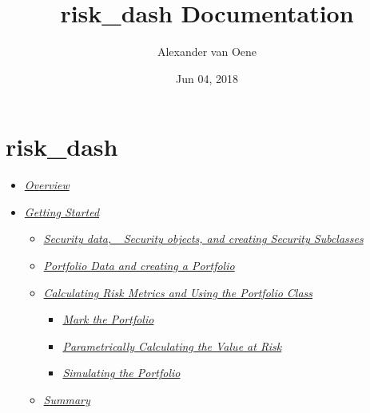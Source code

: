 \documentclass[letterpaper,10pt,english]{sphinxmanual}
\title{risk\_dash Documentation}
\date{Jun 04, 2018}
\author{Alexander van Oene}
\begin{document}
\maketitle
\sphinxtableofcontents
{}\label{\detokenize{index::doc}}

\label{\detokenize{gettingstarted:gettingstarted}}

\chapter{risk\_dash}
\label{\detokenize{gettingstarted:risk-dash}}\label{\detokenize{gettingstarted::doc}}\begin{itemize}
\item {} 
{\hyperref[\detokenize{gettingstarted:overview}]{\emph{Overview}}}

\item {} 
{\hyperref[\detokenize{gettingstarted:getting-started}]{\emph{Getting Started}}}
\begin{itemize}
\item {} 
{\hyperref[\detokenize{gettingstarted:security-data-security-objects-and-creating-security-subclasses}]{\emph{Security data, \_Security objects, and creating Security
Subclasses}}}

\item {} 
{\hyperref[\detokenize{gettingstarted:portfolio-data-and-creating-a-portfolio}]{\emph{Portfolio Data and creating a
Portfolio}}}

\item {} 
{\hyperref[\detokenize{gettingstarted:calculating-risk-metrics-and-using-the-portfolio-class}]{\emph{Calculating Risk Metrics and Using the Portfolio
Class}}}
\begin{itemize}
\item {} 
{\hyperref[\detokenize{gettingstarted:mark-the-portfolio}]{\emph{Mark the Portfolio}}}

\item {} 
{\hyperref[\detokenize{gettingstarted:parametrically-calculating-the-value-at-risk}]{\emph{Parametrically Calculating the Value at
Risk}}}

\item {} 
{\hyperref[\detokenize{gettingstarted:simulating-the-portfolio}]{\emph{Simulating the Portfolio}}}

\end{itemize}

\item {} 
{\hyperref[\detokenize{gettingstarted:summary}]{\emph{Summary}}}

\end{itemize}

\end{itemize}
\end{document}
